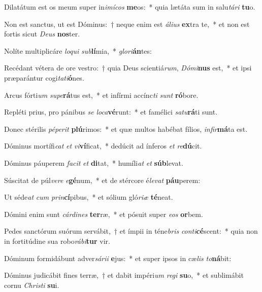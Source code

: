 \item Dilatátum est os meum super in\textit{i}\textit{mí}\textit{cos} \textbf{me}os:~* quia lætáta sum in salu\textit{tá}\textit{ri} \textbf{tu}o.
\item Non est sanctus, ut est Dóminus:~† neque enim est \textit{á}\textit{li}\textit{us} \textbf{ex}tra te,~* et non est fortis sicut \textit{De}\textit{us} \textbf{nos}ter.
\item Nolíte multiplicáre \textit{lo}\textit{qui} \textit{sub}\textbf{lí}mia,~* \textit{glo}\textit{ri}\textbf{án}tes:
\item Recédant vétera de ore vestro:~† quia Deus scientiá\textit{rum}, \textit{Dó}\textit{mi}\textbf{nus} est,~* et ipsi præparántur cogi\textit{ta}\textit{ti}\textbf{ó}nes.
\item Arcus fórti\textit{um} \textit{su}\textit{pe}\textbf{rá}tus est,~* et infírmi accínc\textit{ti} \textit{sunt} \textbf{ró}bore.
\item Repléti prius, pro pánibus \textit{se} \textit{lo}\textit{ca}\textbf{vé}runt:~* et famélici \textit{sa}\textit{tu}\textbf{rá}ti sunt.
\item Donec stérilis \textit{pé}\textit{pe}\textit{rit} \textbf{plú}rimos:~* et quæ multos habébat fílios, \textit{in}\textit{fir}\textbf{má}ta est.
\item Dóminus mortífi\textit{cat} \textit{et} \textit{vi}\textbf{ví}ficat,~* dedúcit ad ínferos \textit{et} \textit{re}\textbf{dú}cit.
\item Dóminus páuperem \textit{fa}\textit{cit} \textit{et} \textbf{di}tat,~* humíli\textit{at} \textit{et} \textbf{súb}levat.
\item Súscitat de púl\textit{ve}\textit{re} \textit{e}\textbf{gé}num,~* et de stércore é\textit{le}\textit{vat} \textbf{páu}perem:
\item Ut séde\textit{at} \textit{cum} \textit{prin}\textbf{cí}pibus,~* et sólium gló\textit{ri}\textit{æ} \textbf{té}neat.
\item Dómini enim sunt \textit{cár}\textit{di}\textit{nes} \textbf{ter}ræ,~* et pósuit super \textit{e}\textit{os} \textbf{or}bem.
\item Pedes sanctórum suórum servábit,~† et ímpii in téne\textit{bris} \textit{con}\textit{ti}\textbf{cé}scent:~* quia non in fortitúdine sua robo\textit{rá}\textit{bi}\textbf{tur} vir.
\item Dóminum formidábunt adver\textit{sá}\textit{ri}\textit{i} \textbf{e}jus:~* et super ipsos in cæ\textit{lis} \textit{to}\textbf{ná}bit:
\item Dóminus judicábit fines terræ,~† et dabit impéri\textit{um} \textit{re}\textit{gi} \textbf{su}o,~* et sublimábit cornu \textit{Chris}\textit{ti} \textbf{su}i.
